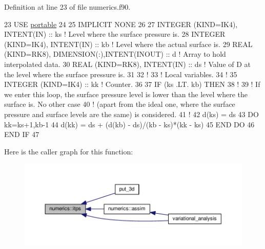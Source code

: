 Definition at line 23 of file numerics.\+f90.


\begin{DoxyCode}
23 \textcolor{keywordtype}{USE }\hyperlink{namespaceportable}{portable}
24 
25 \textcolor{keywordtype}{IMPLICIT NONE}
26 
27 \textcolor{keywordtype}{INTEGER (KIND=IK4)}, \textcolor{keywordtype}{INTENT(IN)}              :: ks   \textcolor{comment}{! Level where the surface pressure is.}
28 \textcolor{keywordtype}{INTEGER (KIND=IK4)}, \textcolor{keywordtype}{INTENT(IN)}              :: kb   \textcolor{comment}{! Level where the actual surface is.}
29 \textcolor{keywordtype}{REAL (KIND=RK8)}, \textcolor{keywordtype}{DIMENSION(:)},\textcolor{keywordtype}{INTENT(INOUT)} :: d    \textcolor{comment}{! Array to hold interpolated data.}
30 \textcolor{keywordtype}{REAL (KIND=RK8)}, \textcolor{keywordtype}{INTENT(IN)}                 :: ds   \textcolor{comment}{! Value of D at the level where the surface pressure
       is.}
31 
32 \textcolor{comment}{!}
33 \textcolor{comment}{! Local variables.}
34 \textcolor{comment}{!}
35 \textcolor{keywordtype}{INTEGER (KIND=IK4)}                          :: kk   \textcolor{comment}{! Counter.}
36 
37 \textcolor{keywordflow}{IF} (ks .LT. kb) \textcolor{keywordflow}{THEN}
38     \textcolor{comment}{!}
39     \textcolor{comment}{! If we enter this loop, the surface pressure level is lower than the level where the surface is. No
       other case}
40     \textcolor{comment}{! (apart from the ideal one, where the surface pressure and surface levels are the same) is considered.}
41     \textcolor{comment}{!}
42     d(ks)       = ds
43     \textcolor{keywordflow}{DO} kk=ks+1,kb-1
44         d(kk)   = ds + (d(kb) - ds)/(kb - ks)*(kk - ks)
45 \textcolor{keywordflow}{    END DO}
46 \textcolor{keywordflow}{END IF}
47 
\end{DoxyCode}


Here is the caller graph for this function\+:\nopagebreak
\begin{figure}[H]
\begin{center}
\leavevmode
\includegraphics[width=350pt]{namespacenumerics_ac972e0e69239cba641ad373fee101472_icgraph}
\end{center}
\end{figure}


